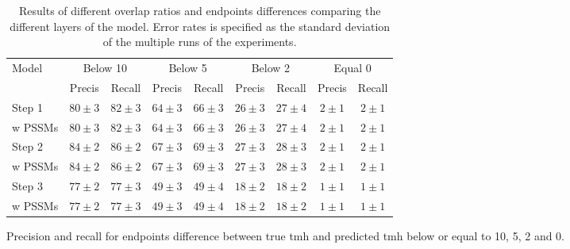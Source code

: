 \begin{table}
	\begin{subtable}[]{\textwidth}
		\begin{tabular}{l|c|c|c|c|c|c|c|c} 
			Model & \multicolumn{2}{|c}{Below 10}& \multicolumn{2}{|c}{Below 5}& \multicolumn{2}{|c}{Below 2}& \multicolumn{2}{|c}{Equal 0}\\ 
			& Precis & Recall & Precis & Recall & Precis & Recall & Precis & Recall \\ \hline 
			Step 1 & $ 80 \pm 3 $ & $ 82 \pm 3 $ & $ 64 \pm 3 $ & $ 66 \pm 3 $ & $ 26 \pm 3 $ & $ 27 \pm 4 $ & $  2 \pm 1 $ & $  2 \pm 1 $ \\ 
			w PSSMs& $ 80 \pm 3 $ & $ 82 \pm 3 $ & $ 64 \pm 3 $ & $ 66 \pm 3 $ & $ 26 \pm 3 $ & $ 27 \pm 4 $ & $  2 \pm 1 $ & $  2 \pm 1 $ \\
			Step 2 & $ 84 \pm 2 $ & $ 86 \pm 2 $ & $ 67 \pm 3 $ & $ 69 \pm 3 $ & $ 27 \pm 3 $ & $ 28 \pm 3 $ & $  2 \pm 1 $ & $  2 \pm 1 $ \\ 
			w PSSMs& $ 84 \pm 2 $ & $ 86 \pm 2 $ & $ 67 \pm 3 $ & $ 69 \pm 3 $ & $ 27 \pm 3 $ & $ 28 \pm 3 $ & $  2 \pm 1 $ & $  2 \pm 1 $ \\
			Step 3 & $ 77 \pm 2 $ & $ 77 \pm 3 $ & $ 49 \pm 3 $ & $ 49 \pm 4 $ & $ 18 \pm 2 $ & $ 18 \pm 2 $ & $  1 \pm 1 $ & $  1 \pm 1 $ \\ 
			w PSSMs& $ 77 \pm 2 $ & $ 77 \pm 3 $ & $ 49 \pm 3 $ & $ 49 \pm 4 $ & $ 18 \pm 2 $ & $ 18 \pm 2 $ & $  1 \pm 1 $ & $  1 \pm 1 $ \\
		\end{tabular}
		\caption{Precision and recall for endpoints difference between true 
			\gls{tmh} and predicted \gls{tmh} below or equal to 10, 5, 2 and 0.}
		\label{tab:endpoint}
	\end{subtable}
	\caption{Results of different overlap ratios and endpoints differences comparing the different layers of the model.
	Error rates is specified as the standard deviation of the multiple runs of the experiments.}
	\label{tab:step_compare}
\end{table}

